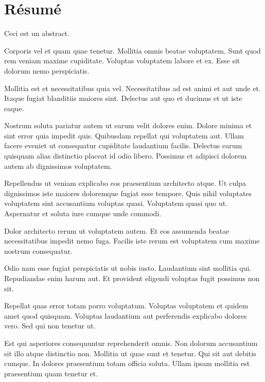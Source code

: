 \chapter{Résumé}


Ceci est un abstract.

Corporis vel et quam quae tenetur. Mollitia omnis beatae voluptatem. Sunt quod rem veniam maxime cupiditate. Voluptas voluptatem labore et ex. Esse sit dolorum nemo perspiciatis.

Mollitia est et necessitatibus quia vel. Necessitatibus ad est animi et aut unde et. Itaque fugiat blanditiis maiores sint. Delectus aut quo et ducimus et ut iste eaque.

Nostrum soluta pariatur autem ut earum velit dolores enim. Dolore minima et sint error quia impedit quis. Quibusdam repellat qui voluptatem aut. Ullam facere eveniet ut consequatur cupiditate laudantium facilis. Delectus earum quisquam alias distinctio placeat id odio libero. Possimus et adipisci dolorem autem ab dignissimos voluptatem.

Repellendus ut veniam explicabo eos praesentium architecto atque. Ut culpa dignissimos iste maiores doloremque fugiat esse tempore. Quis nihil voluptates voluptatem sint accusantium voluptas quasi. Voluptatem quasi quo ut. Aspernatur et soluta iure cumque unde commodi.

Dolor architecto rerum ut voluptatem autem. Et eos assumenda beatae necessitatibus impedit nemo fuga. Facilis iste rerum est voluptatem cum maxime nostrum consequatur.

Odio nam esse fugiat perspiciatis ut nobis iusto. Laudantium sint mollitia qui. Repudiandae enim harum aut. Et provident eligendi voluptas fugit possimus non sit.

Repellat quas error totam porro voluptatum. Voluptas voluptatem et quidem amet quod quisquam. Voluptas laudantium aut perferendis explicabo dolores vero. Sed qui non tenetur ut.

Est qui asperiores consequuntur reprehenderit omnis. Non dolorum accusantium sit illo atque distinctio non. Mollitia ut quae sunt et tenetur. Qui sit aut debitis cumque. In dolores praesentium totam officia soluta. Ullam ipsam mollitia est praesentium quam tenetur et.
